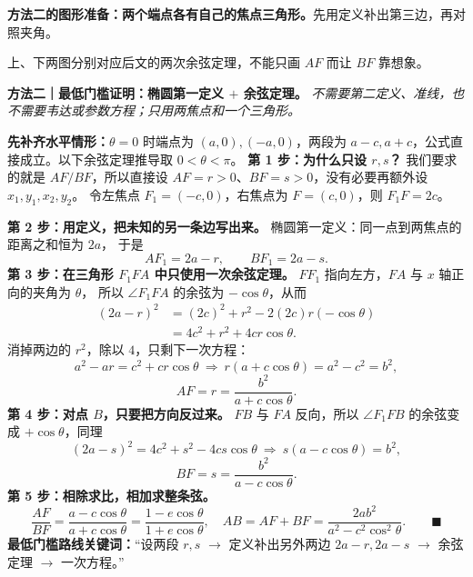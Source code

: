 \clearpage
\begin{proofbox}
\textbf{方法二的图形准备：两个端点各有自己的焦点三角形。}先用定义补出第三边，再对照夹角。\begin{center}\end{center}
上、下两图分别对应后文的两次余弦定理，不能只画 $AF$ 而让 $BF$ 靠想象。
\end{proofbox}
\clearpage
\begin{proofbox}
\textbf{方法二｜最低门槛证明：椭圆第一定义 $+$ 余弦定理。}\quad
\emph{不需要第二定义、准线，也不需要韦达或参数方程；只用两焦点和一个三角形。}
\par\smallskip\noindent
\textbf{先补齐水平情形：}$\theta=0$ 时端点为 $(a,0),(-a,0)$，两段为 $a-c,a+c$，公式直接成立。以下余弦定理推导取 $0<\theta<\pi$。
\textbf{第 1 步：为什么只设 $r,s$？}
我们要求的就是 $AF/BF$，所以直接设
$AF=r>0$、$BF=s>0$，没有必要再额外设 $x_1,y_1,x_2,y_2$。
令左焦点 $F_1=(-c,0)$，右焦点为 $F=(c,0)$，则
$F_1F=2c$。
\par\smallskip\noindent
\textbf{第 2 步：用定义，把未知的另一条边写出来。}
椭圆第一定义：同一点到两焦点的距离之和恒为 $2a$，
于是
\[
 AF_1=2a-r,\qquad BF_1=2a-s.
\]
\textbf{第 3 步：在三角形 $F_1FA$ 中只使用一次余弦定理。}
$FF_1$ 指向左方，$FA$ 与 $x$ 轴正向的夹角为 $\theta$，
所以 $\angle F_1FA$ 的余弦为 $-\cos\theta$，从而
\[
 \begin{aligned}
 (2a-r)^2
 &= (2c)^2+r^2-2(2c)r(-\cos\theta)\\
 &=4c^2+r^2+4cr\cos\theta.
 \end{aligned}
\]
消掉两边的 $r^2$，除以 $4$，只剩下一次方程：
\[
 a^2-ar=c^2+cr\cos\theta
 \ \Longrightarrow\ r(a+c\cos\theta)=a^2-c^2=b^2,
\]
\[
 \boxed{AF=r=\frac{b^2}{a+c\cos\theta}}.
\]
\textbf{第 4 步：对点 $B$，只要把方向反过来。}
$FB$ 与 $FA$ 反向，所以 $\angle F_1FB$ 的余弦变成
$+\cos\theta$，同理
\[
 (2a-s)^2=4c^2+s^2-4cs\cos\theta
 \ \Longrightarrow\ s(a-c\cos\theta)=b^2,
\]
\[
 \boxed{BF=s=\frac{b^2}{a-c\cos\theta}}.
\]
\textbf{第 5 步：相除求比，相加求整条弦。}
\[
 \frac{AF}{BF}=\frac{a-c\cos\theta}{a+c\cos\theta}
 =\frac{1-e\cos\theta}{1+e\cos\theta},
\quad AB=AF+BF=\frac{2ab^2}{a^2-c^2\cos^2\theta}.
\qquad\blacksquare
\]
\textbf{最低门槛路线关键词：}``设两段 $r,s$ $\to$
定义补出另外两边 $2a-r,2a-s$ $\to$ 余弦定理 $\to$ 一次方程。''
\end{proofbox}

